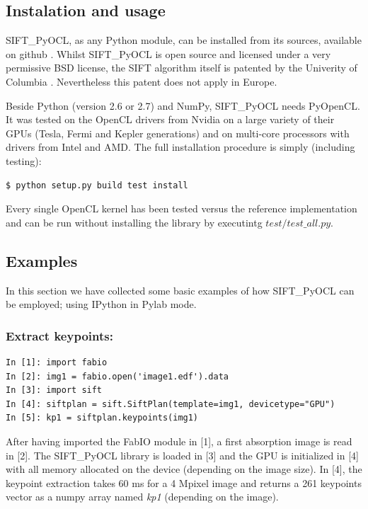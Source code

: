 \documentclass[preprint]{iucr}
\begin{document}
\subsection{Instalation and usage}
SIFT\_PyOCL, as any Python module, can be installed from its sources,
available on github \cite{sift_pyocl}.
Whilst SIFT\_PyOCL is open source and licensed under a very
permissive BSD license, the SIFT algorithm itself is
patented by the Univerity of Columbia \cite{SIFT_pat}.
Nevertheless this patent does not apply in Europe.

Beside Python (version 2.6 or 2.7) and NumPy, SIFT\_PyOCL needs
PyOpenCL.
It was tested on the OpenCL drivers from Nvidia on a
large variety of their GPUs (Tesla, Fermi and Kepler generations) and on
multi-core processors with drivers from Intel and AMD.
The full installation procedure is simply (including testing):
\begin{verbatim}
$ python setup.py build test install
\end{verbatim}
Every single OpenCL kernel has been tested versus the reference
implementation and can be run without installing the library by
executintg $test/test\_all.py$.

\subsection{Examples}

In this section we have collected some basic examples of how
SIFT\_PyOCL can be employed; using IPython \cite{ipython} in
Pylab \cite{matplotlib} mode.

\subsubsection{Extract keypoints:}
\begin{verbatim}
In [1]: import fabio
In [2]: img1 = fabio.open('image1.edf').data
In [3]: import sift
In [4]: siftplan = sift.SiftPlan(template=img1, devicetype="GPU")
In [5]: kp1 = siftplan.keypoints(img1)
\end{verbatim}

After having imported the FabIO \cite{fabio} module in [1], a first
absorption image is read in [2]. The SIFT\_PyOCL library is loaded in [3] and the
GPU is initialized in [4] with all memory allocated on the device (depending on
the image size).
In [4], the keypoint extraction takes 60 ms for a
4 Mpixel image and returns a 261 keypoints vector as a numpy array named
\emph{kp1} (depending on the image).
\end{document}
